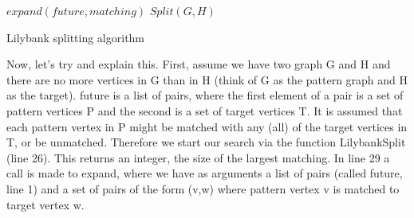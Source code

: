 \documentclass[letterpaper]{article}
\begin{document}
\begin{algorithm}
\DontPrintSemicolon
\nl $expand(\mathit{future},matching)$ \;
\nl {}
\;
\nl $Split(G,H)$ \;
\nl {}
\caption{Lilybank splitting algorithm}
\label{jtAlg}
\end{algorithm}

Now, let's try and explain this. First, assume we have two graph G and H and there are no more vertices in G than in H (think of G as the pattern graph and H as the target).
future is a list of pairs, where the first element of a pair is a set of pattern vertices P and the second is a set of target vertices T. It is assumed that each pattern vertex in P 
might be matched with any (all) of the target vertices in T, or be unmatched. Therefore we start our search via the function LilybankSplit (line 26). This returns an integer, the size of the largest matching.
In line 29 a call is made to expand, where we have as arguments a list of pairs (called future, line 1) and a set of pairs of the form (v,w) where pattern vertex v is matched to target vertex w.
\end{document}
